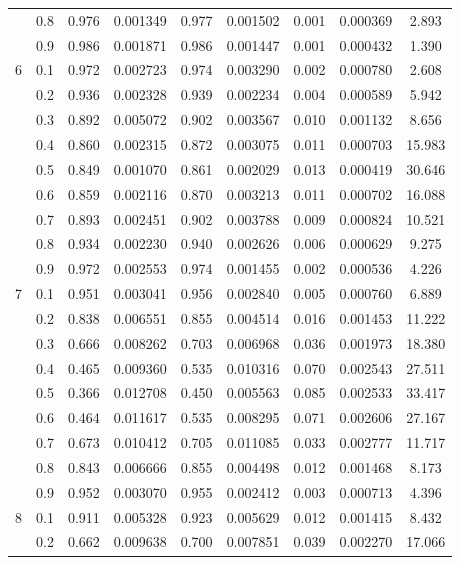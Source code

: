 \begin{longtable}{ | c | c || c | c | c | c | c | c | c | }
 & 0.8 & 0.976 & 0.001349 & 0.977 & 0.001502 & 0.001 & 0.000369 & 2.893 \\
 & 0.9 & 0.986 & 0.001871 & 0.986 & 0.001447 & 0.001 & 0.000432 & 1.390 \\
 \hline
\multirow{9}{*}{6} & 0.1 & 0.972 & 0.002723 & 0.974 & 0.003290 & 0.002 & 0.000780 & 2.608 \\
 & 0.2 & 0.936 & 0.002328 & 0.939 & 0.002234 & 0.004 & 0.000589 & 5.942 \\
 & 0.3 & 0.892 & 0.005072 & 0.902 & 0.003567 & 0.010 & 0.001132 & 8.656 \\
 & 0.4 & 0.860 & 0.002315 & 0.872 & 0.003075 & 0.011 & 0.000703 & 15.983 \\
 & 0.5 & 0.849 & 0.001070 & 0.861 & 0.002029 & 0.013 & 0.000419 & 30.646 \\
 & 0.6 & 0.859 & 0.002116 & 0.870 & 0.003213 & 0.011 & 0.000702 & 16.088 \\
 & 0.7 & 0.893 & 0.002451 & 0.902 & 0.003788 & 0.009 & 0.000824 & 10.521 \\
 & 0.8 & 0.934 & 0.002230 & 0.940 & 0.002626 & 0.006 & 0.000629 & 9.275 \\
 & 0.9 & 0.972 & 0.002553 & 0.974 & 0.001455 & 0.002 & 0.000536 & 4.226 \\
 \hline
\multirow{9}{*}{7} & 0.1 & 0.951 & 0.003041 & 0.956 & 0.002840 & 0.005 & 0.000760 & 6.889 \\
 & 0.2 & 0.838 & 0.006551 & 0.855 & 0.004514 & 0.016 & 0.001453 & 11.222 \\
 & 0.3 & 0.666 & 0.008262 & 0.703 & 0.006968 & 0.036 & 0.001973 & 18.380 \\
 & 0.4 & 0.465 & 0.009360 & 0.535 & 0.010316 & 0.070 & 0.002543 & 27.511 \\
 & 0.5 & 0.366 & 0.012708 & 0.450 & 0.005563 & 0.085 & 0.002533 & 33.417 \\
 & 0.6 & 0.464 & 0.011617 & 0.535 & 0.008295 & 0.071 & 0.002606 & 27.167 \\
 & 0.7 & 0.673 & 0.010412 & 0.705 & 0.011085 & 0.033 & 0.002777 & 11.717 \\
 & 0.8 & 0.843 & 0.006666 & 0.855 & 0.004498 & 0.012 & 0.001468 & 8.173 \\
 & 0.9 & 0.952 & 0.003070 & 0.955 & 0.002412 & 0.003 & 0.000713 & 4.396 \\
 \hline
\multirow{9}{*}{8} & 0.1 & 0.911 & 0.005328 & 0.923 & 0.005629 & 0.012 & 0.001415 & 8.432 \\
 & 0.2 & 0.662 & 0.009638 & 0.700 & 0.007851 & 0.039 & 0.002270 & 17.066 \\

\end{longtable}
